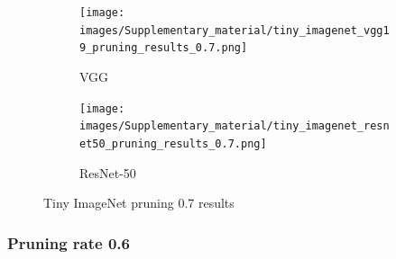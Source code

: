 \begin{figure}[h]
 \centering
     \begin{subfigure}[b]{\columnwidth}
    \texttt{[image: images/Supplementary\_material/tiny\_imagenet\_vgg19\_pruning\_results\_0.7.png]}
    \caption{VGG}
    \label{subfig:vgg19CIfar10PR0.7}
     \end{subfigure}
      \hfill
     \begin{subfigure}[b]{\columnwidth}
    \texttt{[image: images/Supplementary\_material/tiny\_imagenet\_resnet50\_pruning\_results\_0.7.png]}
    \caption{ResNet-50}
    \label{subfig:resenet50CIfar10PR0.7}
     \end{subfigure}
     \caption{ Tiny ImageNet pruning 0.7 results}
    \label{fig:pr_0.7_tiny_imagenet}
\end{figure}

\subsubsection*{Pruning rate 0.6}

